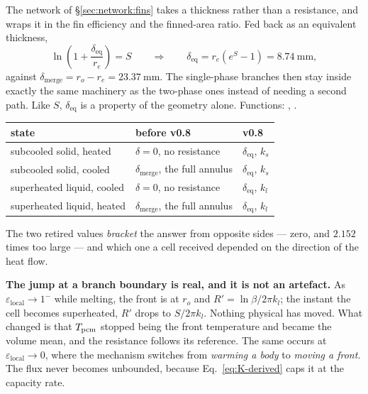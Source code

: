 The network of \S\ref{sec:network:fins} takes a thickness rather than a
resistance, and wraps it in the fin efficiency and the finned-area ratio. Fed
back as an equivalent thickness,
\begin{equation}
  \ln\left(1+\frac{\delta_{\mathrm{eq}}}{r_{e}}\right)=S
  \qquad\Longrightarrow\qquad
  \delta_{\mathrm{eq}} = r_{e}\left(e^{S}-1\right) = \SI{8.74}{\milli\meter},
  \label{eq:delta-eq}
\end{equation}
against $\delta_{\mathrm{merge}}=r_{o}-r_{e}=\SI{23.37}{\milli\meter}$. The
single-phase branches then stay inside exactly the same machinery as the
two-phase ones instead of needing a second path. Like $S$, $\delta_{\mathrm{eq}}$
is a property of the geometry alone. Functions: ,
.

\begin{center}
\begin{tabular}{@{}l l l@{}}
\toprule
state & before v0.8 & v0.8 \\
\midrule
subcooled solid, heated    & $\delta=0$, no resistance &
  $\delta_{\mathrm{eq}}$, $k_{s}$ \\
subcooled solid, cooled    & $\delta_{\mathrm{merge}}$, the full annulus &
  $\delta_{\mathrm{eq}}$, $k_{s}$ \\
superheated liquid, cooled & $\delta=0$, no resistance &
  $\delta_{\mathrm{eq}}$, $k_{l}$ \\
superheated liquid, heated & $\delta_{\mathrm{merge}}$, the full annulus &
  $\delta_{\mathrm{eq}}$, $k_{l}$ \\
\bottomrule
\end{tabular}
\end{center}

\noindent
The two retired values \emph{bracket} the answer from opposite sides --- zero,
and $2.152$ times too large --- and which one a cell received depended on the
direction of the heat flow.

\medskip
\noindent\textbf{The jump at a branch boundary is real, and it is not an
artefact.} As $\varepsilon_{\mathrm{local}}\to1^{-}$ while melting, the front is
at $r_{o}$ and $R'=\ln\beta/2\pi k_{l}$; the instant the cell becomes
superheated, $R'$ drops to $S/2\pi k_{l}$. Nothing physical has moved. What
changed is that $T_{\mathrm{pcm}}$ stopped being the front temperature and became the
volume mean, and the resistance follows its reference. The same occurs at
$\varepsilon_{\mathrm{local}}\to0$, where the mechanism switches from
\emph{warming a body} to \emph{moving a front}. The flux never becomes
unbounded, because Eq.~\eqref{eq:K-derived} caps it at the capacity rate.

